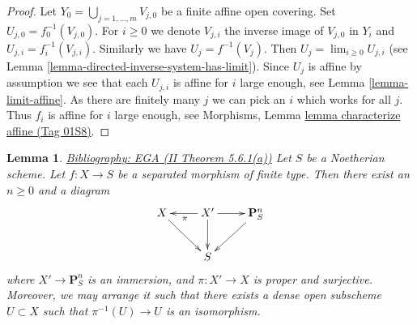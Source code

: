 \documentclass{amsart}
\newenvironment{reference}{\comment}{\endcomment}
\theoremstyle{plain}
\newtheorem{lemma}[subsection]{Lemma}
\theoremstyle{definition}
\theoremstyle{remark}
\numberwithin{equation}{subsection}
\def\lim{\mathop{\mathrm{lim}}\nolimits}
\begin{document}
\begin{proof}
Let $Y_0 = \bigcup_{j = 1, \ldots, m} V_{j, 0}$ be a finite affine
open covering. Set $U_{j, 0} = f_0^{-1}(V_{j, 0})$. For $i \geq 0$
we denote $V_{j, i}$ the inverse image of $V_{j, 0}$ in $Y_i$ and
$U_{j, i} = f_i^{-1}(V_{j, i})$. Similarly we have
$U_j = f^{-1}(V_j)$. Then $U_j = \lim_{i \geq 0} U_{j, i}$
(see Lemma \ref{lemma-directed-inverse-system-has-limit}).
Since $U_j$ is affine by assumption we see that
each $U_{j, i}$ is affine for $i$ large enough, see
Lemma \ref{lemma-limit-affine}. As there are finitely many $j$ we
can pick an $i$ which works for all $j$. Thus $f_i$ is
affine for $i$ large enough, see
Morphisms, Lemma \href{https://stacks.math.columbia.edu/tag/01S8}{lemma characterize affine (Tag 01S8)}.
\end{proof}


\begin{lemma}
\label{coherent-lemma-chow-Noetherian}
\begin{reference}
\href{https://stacks.math.columbia.edu/bibliography}{Bibliography: EGA (II Theorem 5.6.1(a))}
\end{reference}
Let $S$ be a Noetherian scheme.
Let $f : X \to S$ be a separated morphism of finite type.
Then there exist an $n \geq 0$ and a diagram
$$
\xymatrix{
X \ar[rd] & X' \ar[d] \ar[l]^\pi \ar[r] & \mathbf{P}^n_S \ar[dl] \\
& S &
}
$$
where $X' \to \mathbf{P}^n_S$ is an immersion, and
$\pi : X' \to X$ is proper and surjective. Moreover, we may
arrange it such that there exists a dense open subscheme
$U \subset X$ such that $\pi^{-1}(U) \to U$ is an isomorphism.
\end{lemma}
\end{document}
